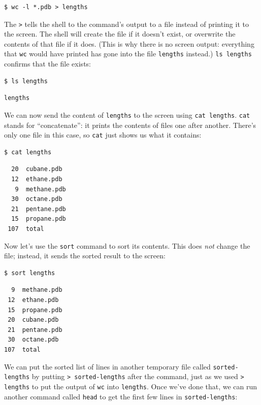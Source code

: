 \documentclass{book}
\begin{document}
\begin{verbatim}
$ wc -l *.pdb > lengths
\end{verbatim}

The \texttt{\textgreater{}} tells the shell to
 the command's output to a file instead
of printing it to the screen. The shell will create the file if it
doesn't exist, or overwrite the contents of that file if it does. (This
is why there is no screen output: everything that \texttt{wc} would have
printed has gone into the file \texttt{lengths} instead.)
\texttt{ls lengths} confirms that the file exists:

\begin{verbatim}
$ ls lengths
\end{verbatim}

\begin{verbatim}
lengths
\end{verbatim}

We can now send the content of \texttt{lengths} to the screen using
\texttt{cat lengths}. \texttt{cat} stands for ``concatenate'': it prints
the contents of files one after another. There's only one file in this
case, so \texttt{cat} just shows us what it contains:

\begin{verbatim}
$ cat lengths
\end{verbatim}

\begin{verbatim}
  20  cubane.pdb
  12  ethane.pdb
   9  methane.pdb
  30  octane.pdb
  21  pentane.pdb
  15  propane.pdb
 107  total
\end{verbatim}

Now let's use the \texttt{sort} command to sort its contents. This does
\emph{not} change the file; instead, it sends the sorted result to the
screen:

\begin{verbatim}
$ sort lengths
\end{verbatim}

\begin{verbatim}
  9  methane.pdb
 12  ethane.pdb
 15  propane.pdb
 20  cubane.pdb
 21  pentane.pdb
 30  octane.pdb
107  total
\end{verbatim}

We can put the sorted list of lines in another temporary file called
\texttt{sorted-lengths} by putting
\texttt{\textgreater{} sorted-lengths} after the command, just as we
used \texttt{\textgreater{} lengths} to put the output of \texttt{wc}
into \texttt{lengths}. Once we've done that, we can run another command
called \texttt{head} to get the first few lines in
\texttt{sorted-lengths}:
\end{document}
